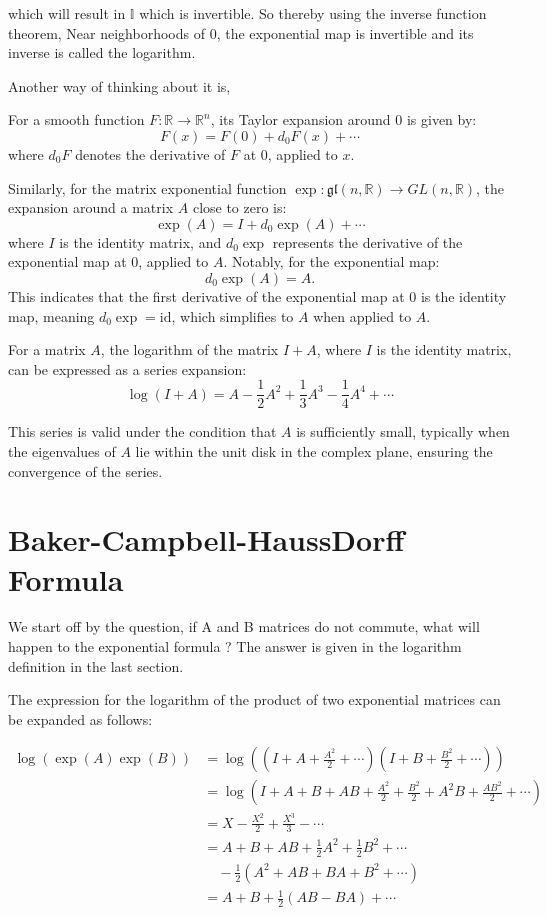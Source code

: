 \documentclass{article}
\begin{document}
which will result in \( \mathbb{I} \) which is invertible. So thereby using the inverse function theorem, Near neighborhoods of \( 0 \), the exponential map is invertible and its inverse is called the logarithm.

Another way of thinking about it is, 

For a smooth function \( F: \mathbb{R} \to \mathbb{R}^n \), its Taylor expansion around 0 is given by:
\[
F(x) = F(0) + d_0F(x) + \cdots
\]
where \( d_0F \) denotes the derivative of \( F \) at 0, applied to \( x \).

Similarly, for the matrix exponential function \( \exp: \mathfrak{gl}(n, \mathbb{R}) \to GL(n, \mathbb{R}) \), the expansion around a matrix \( A \) close to zero is:
\[
\exp(A) = I + d_0 \exp(A) + \cdots
\]
where \( I \) is the identity matrix, and \( d_0 \exp \) represents the derivative of the exponential map at 0, applied to \( A \). Notably, for the exponential map:
\[
d_0 \exp(A) = A.
\]
This indicates that the first derivative of the exponential map at 0 is the identity map, meaning \( d_0 \exp = \text{id} \), which simplifies to \( A \) when applied to \( A \).

\begin{theorem} 
    For a matrix \( A \), the logarithm of the matrix \( I + A \), where \( I \) is the identity matrix, can be expressed as a series expansion:
\[
\log(I + A) = A - \frac{1}{2} A^2 + \frac{1}{3} A^3 - \frac{1}{4} A^4 + \cdots
\]

\end{theorem}
This series is valid under the condition that \( A \) is sufficiently small, typically when the eigenvalues of \( A \) lie within the unit disk in the complex plane, ensuring the convergence of the series.

\section{Baker-Campbell-HaussDorff Formula}

We start off by the question, if A and B matrices do not commute, what will happen to the exponential formula ? The answer is given in the logarithm definition in the last section. 

The expression for the logarithm of the product of two exponential matrices can be expanded as follows:

\begin{align*}
\log(\exp(A) \exp(B)) &= \log \left( \left( I + A + \frac{A^2}{2} + \cdots \right) \left( I + B + \frac{B^2}{2} + \cdots \right) \right) \\
&= \log \left( I + A + B + AB + \frac{A^2}{2} + \frac{B^2}{2} + A^2B + \frac{AB^2}{2} + \cdots \right) \\
&= X - \frac{X^2}{2} + \frac{X^3}{3} - \cdots \\
&= A + B + AB + \frac{1}{2} A^2 + \frac{1}{2} B^2 + \cdots \\
&\quad - \frac{1}{2} \left( A^2 + AB + BA + B^2 + \cdots \right) \\
&= A + B + \frac{1}{2}(AB - BA) + \cdots
\end{align*}
\end{document}
